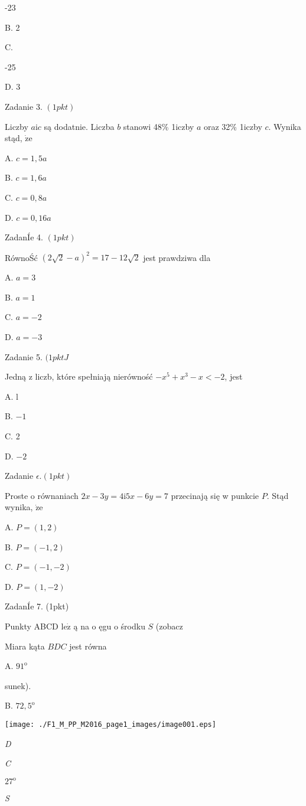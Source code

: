 \documentclass[a4paper,12pt]{article}
\begin{document}
-23

B. 2

C.

-25

D. 3

Zadanie 3. $(1pkt)$

Liczby $a\mathrm{i}c$ są dodatnie. Liczba $b$ stanowi 48\% 1iczby $a$ oraz 32\% 1iczby $c$. Wynika stąd, $\dot{\mathrm{z}}\mathrm{e}$

A. $c=1,5a$

B. $c=1,6a$

C. $c=0,8a$

D. $c=0,16a$

ZadanÍe 4. $(1pkt)$

RównoŚć $(2\sqrt{2}-a)^{2}=17-12\sqrt{2}$ jest prawdziwa dla

A. $a=3$

B. $a=1$

C. $a=-2$

D. $a=-3$

Zadanie 5. $(1pktJ$

Jedną z liczb, które spełniają nierówność $-x^{5}+x^{3}-x<-2$, jest

A. l

B. $-1$

C. 2

D. $-2$

Zadanie $\epsilon. (1pkt)$

Proste o równaniach $2x-3y=4\mathrm{i}5x-6y=7$ przecinają się w punkcie $P$. Stąd wynika, $\dot{\mathrm{z}}\mathrm{e}$

A. $P=(1,2)$

B. $P=(-1,2)$

C. $P=(-1,-2)$

D. $P=(1,-2)$

ZadanÍe 7. (1pkt)

Punkty ABCD $\mathrm{l}\mathrm{e}\dot{\mathrm{z}}$ ą na o ęgu o środku $S$ (zobacz

Miara kąta $BDC$ jest równa

A. $91^{\mathrm{o}}$

sunek).

B. $72,5^{\mathrm{o}}$
\begin{center}
\texttt{[image: ./F1\_M\_PP\_M2016\_page1\_images/image001.eps]}
\end{center}
{\it D}

{\it C}

$27^{\mathrm{o}}$

{\it S}
\end{document}
